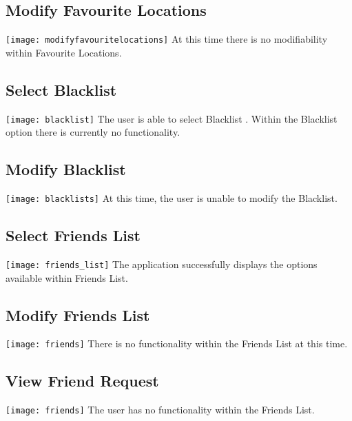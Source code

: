 \documentclass[english]{article}
\begin{document}
\subsection{Modify Favourite Locations}
\texttt{[image: modifyfavouritelocations]}
At this time there is no modifiability within Favourite Locations. 

\subsection{Select Blacklist}
\texttt{[image: blacklist]}
\newline 
The user is able to select Blacklist . Within the Blacklist option there is currently no functionality. 

\subsection{Modify Blacklist}
\texttt{[image: blacklists]}
\newline 
At this time, the user is unable to modify the Blacklist.

\subsection{Select Friends List}
\texttt{[image: friends\_list]}
\newline 
The application successfully displays the options available within Friends List. 

\subsection{Modify Friends List}
\texttt{[image: friends]}
There is no functionality within the Friends List at this time. 

\subsection{View Friend Request}
\texttt{[image: friends]}
The user has no functionality within the Friends List.  
\end{document}
